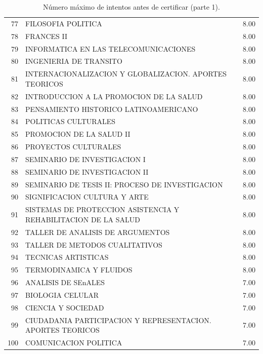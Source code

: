 \documentclass[12pt]{article}
\begin{document}
\begin{table}[ht]
{\begin{tabular}{rlr}
  77 & FILOSOFIA POLITICA & 8.00 \\ 
  78 & FRANCES II & 8.00 \\ 
  79 & INFORMATICA EN LAS TELECOMUNICACIONES & 8.00 \\ 
  80 & INGENIERIA DE TRANSITO & 8.00 \\ 
  81 & INTERNACIONALIZACION Y GLOBALIZACION. APORTES TEORICOS & 8.00 \\ 
  82 & INTRODUCCION A LA PROMOCION DE LA SALUD & 8.00 \\ 
  83 & PENSAMIENTO HISTORICO LATINOAMERICANO & 8.00 \\ 
  84 & POLITICAS CULTURALES & 8.00 \\ 
  85 & PROMOCION DE LA SALUD II & 8.00 \\ 
  86 & PROYECTOS CULTURALES & 8.00 \\ 
  87 & SEMINARIO DE INVESTIGACION I & 8.00 \\ 
  88 & SEMINARIO DE INVESTIGACION II & 8.00 \\ 
  89 & SEMINARIO DE TESIS II: PROCESO DE INVESTIGACION & 8.00 \\ 
  90 & SIGNIFICACION CULTURA Y ARTE & 8.00 \\ 
  91 & SISTEMAS DE PROTECCION ASISTENCIA Y REHABILITACION DE LA SALUD & 8.00 \\ 
  92 & TALLER DE ANALISIS DE ARGUMENTOS & 8.00 \\ 
  93 & TALLER DE METODOS CUALITATIVOS & 8.00 \\ 
  94 & TECNICAS ARTISTICAS & 8.00 \\ 
  95 & TERMODINAMICA Y FLUIDOS & 8.00 \\ 
  96 & ANALISIS DE SEnALES & 7.00 \\ 
  97 & BIOLOGIA CELULAR & 7.00 \\ 
  98 & CIENCIA Y SOCIEDAD & 7.00 \\ 
  99 & CIUDADANIA PARTICIPACION Y REPRESENTACION. APORTES TEORICOS & 7.00 \\ 
  100 & COMUNICACION POLITICA & 7.00 \\ 
   \hline
\end{tabular}}
\caption{\label{Num_Max_Intentos_Cert_1} N\'umero m\'aximo de intentos antes de certificar (parte 1).}
\end{table}
\end{document}
